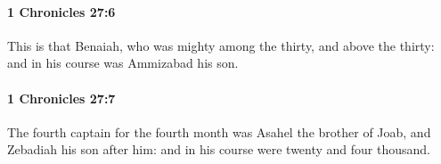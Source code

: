 		\paragraph{1 Chronicles 27:6} %
			\label{1CHRONICLES-27-6}

			This is that Benaiah, who was mighty among the thirty, and above the thirty: and in his course was Ammizabad his son.


		\paragraph{1 Chronicles 27:7} %
			\label{1CHRONICLES-27-7}

			The fourth captain for the fourth month was Asahel the brother of Joab, and Zebadiah his son after him: and in his course were twenty and four thousand.


